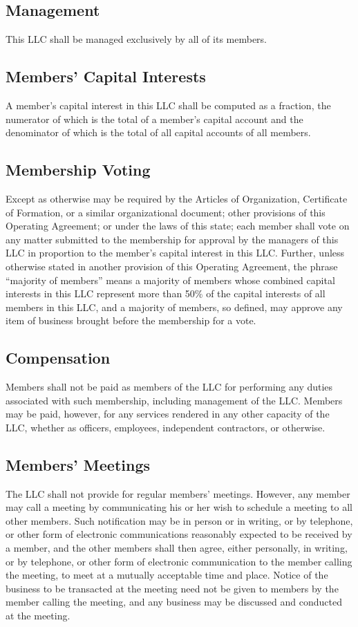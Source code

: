 \documentclass{article}
\begin{document}
			\subsection{Management}
			This LLC shall be managed exclusively by all of its members.

			\subsection{Members' Capital Interests}
			A member's capital interest in this LLC shall be computed as a fraction, the numerator of which is the total of a member's capital account and the denominator of which is the total of all capital accounts of all members.

			\subsection{Membership Voting}
			Except as otherwise may be required by the Articles of Organization, Certificate of Formation, or a similar organizational document; other provisions of this Operating Agreement; or under the laws of this state; each member shall vote on any matter submitted to the membership for approval by the managers of this LLC in proportion to the member's capital interest in this LLC. Further, unless otherwise stated in another provision of this Operating Agreement, the phrase ``majority of members'' means a majority of members whose combined capital interests in this LLC represent more than 50\% of the capital interests of all members in this LLC, and a majority of members, so defined, may approve any item of business brought before the membership for a vote.

			\subsection{Compensation}
			Members shall not be paid as members of the LLC for performing any duties associated with such membership, including management of the LLC. Members may be paid, however, for any services rendered in any other capacity of the LLC, whether as officers, employees, independent contractors, or otherwise.

			\subsection{Members' Meetings}
			The LLC shall not provide for regular members' meetings. However, any member may call a meeting by communicating his or her wish to schedule a meeting to all other members. Such notification may be in person or in writing, or by telephone, or other form of electronic communications reasonably expected to be received by a member, and the other members shall then agree, either personally, in writing, or by telephone, or other form of electronic communication to the member calling the meeting, to meet at a mutually acceptable time and place. Notice of the business to be transacted at the meeting need not be given to members by the member calling the meeting, and any business may be discussed and conducted at the meeting.
\end{document}
